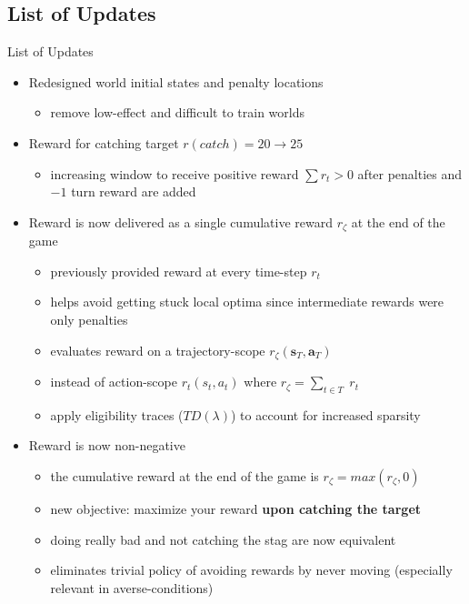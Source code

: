 \documentclass[aspectratio=1610, xcolor=dvipsnames]{packages/beamer}
\begin{document}
\subsection{List of Updates}
\begin{frame}{List of Updates}
    \begin{itemize}
        \item Redesigned world initial states and penalty locations
        \begin{itemize}
            \item remove low-effect and difficult to train worlds
        \end{itemize}
        \item Reward for catching target $r(catch)= 20 \rightarrow 25$
        \begin{itemize}
            \item increasing window to receive positive reward $\sum r_{t} >0$ after penalties and $-1$ turn reward are added
        \end{itemize}
        \item Reward is now delivered as a single cumulative reward $r_\zeta$ at the end of the game
        \begin{itemize}
            \item previously provided reward at every time-step $r_{t}$
            \item helps avoid getting stuck local optima since intermediate rewards were only penalties
            \item evaluates reward on a trajectory-scope $r_\zeta(\mathbf{s}_T,\mathbf{a}_T)$
            \item instead of action-scope $r_{t}(s_t,a_t)$ where $r_\zeta = \sum_{t\in T} \; r_t$
            \item apply eligibility traces ($TD(\lambda)$) to account for increased sparsity
        \end{itemize}
        \item Reward is now non-negative
        \begin{itemize}
            \item the cumulative reward at the end of the game is $r_\zeta = max(r_\zeta,0)$
            \item new objective: maximize your reward \textbf{upon catching the target}
            \item doing really bad and not catching the stag are now equivalent
            \item eliminates trivial policy of avoiding rewards by never moving (especially relevant in averse-conditions)
        \end{itemize}
    \end{itemize}
\end{frame}
\end{document}
